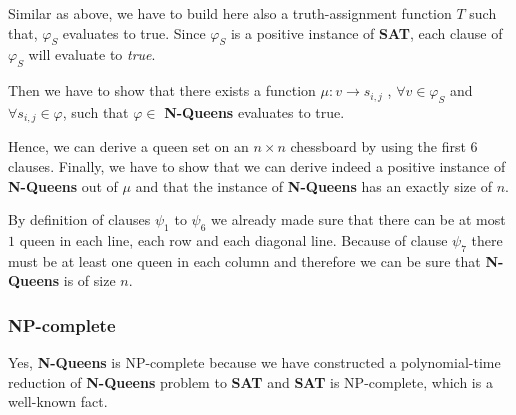 Similar as above, we have to build here also a truth-assignment function $T$
such that, $\varphi _{S}$ evaluates to true. Since $\varphi _{S}$ is a
positive instance of \textbf{SAT}, each clause of $\varphi _{S}$ will
evaluate to \textit{true}.

Then we have to show that there exists a function $\mu :v\rightarrow s_{i,j}$%
, $\forall v\in \varphi _{S}$ and $\forall s_{i,j}\in \varphi $, such that $%
\varphi \in $ \textbf{N-Queens} evaluates to true.

Hence, we can derive a queen set on an $n\times n$ chessboard by using the
first 6 clauses. Finally, we have to show that we can derive indeed a
positive instance of \textbf{N-Queens} out of $\mu $ and that the instance
of \textbf{N-Queens} has an exactly size of $n$.

\medskip

By definition of clauses $\psi _{1}$ to $\psi _{6}$ we already made sure
that there can be at most $1$ queen in each line, each row and each diagonal
line. Because of clause $\psi _{7}$ there must be at least one queen in each
column and therefore we can be sure that \textbf{N-Queens} is of size $n$.

\subsubsection{NP-complete}

Yes, \textbf{N-Queens} is NP-complete because we have constructed a
polynomial-time reduction of \textbf{N-Queens} problem to \textbf{SAT} and 
\textbf{SAT} is NP-complete, which is a well-known fact.

\bigskip
